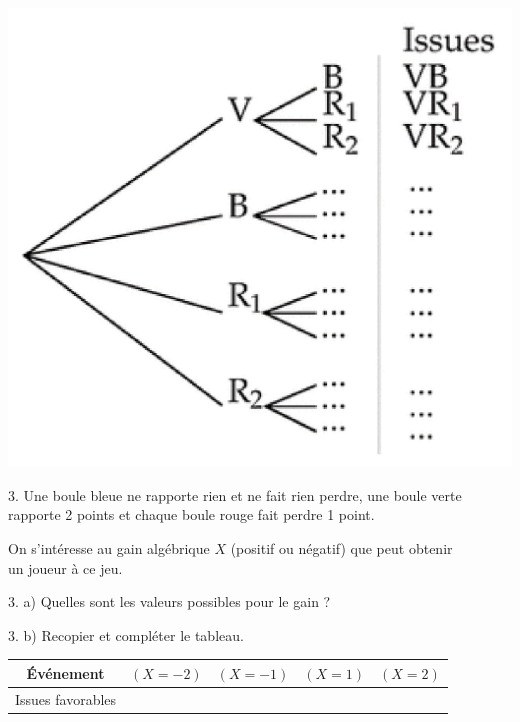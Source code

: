 \documentclass[11pt]{cornouaille}
\begin{document}
\includegraphics{./1S-VA-cours-1}



\vspace{-\baselineskip}



3.   Une boule bleue ne rapporte rien et ne fait rien perdre, une boule verte\\
rapporte 2 points et chaque boule rouge fait perdre 1 point.

On s'int\'{e}resse au gain alg\'{e}brique $X$ (positif ou
n\'{e}gatif) que peut obtenir\\ un joueur \`{a} ce jeu.




3. a)  Quelles sont les valeurs possibles pour le gain ?




3. b)  Recopier et compl\'{e}ter le tableau.




\begin{tabular}{|c|c|c|c|c|}
\hline
{\cellcolor{FondTableaux}\'{E}v\'{e}nement} & $\left( {X = - 2}
\right)$ & $\left( {X = - 1} \right)$ & $\left( {X = 1}
\right)$ & $\left( {X = 2} \right)$ \\\hline
{\cellcolor{FondTableaux} Issues favorables} & & & & \\\hline
\end{tabular}
\end{document}
